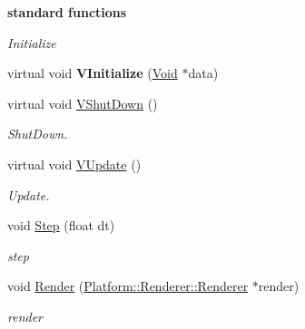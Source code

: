 \begin{Indent}{\bf standard functions}\par
{\em \label{_amgrp57f1c50bd31a278c7d9f58b3e669c84c}
 Initialize }\begin{DoxyCompactItemize}
\item 
\hypertarget{classContent_1_1CO__SC__AD__Scene_af5c7b40892d2fbdadddead7c5d79ab86}{
virtual void {\bfseries VInitialize} (\hyperlink{structVoid}{Void} $\ast$data)}
\label{classContent_1_1CO__SC__AD__Scene_af5c7b40892d2fbdadddead7c5d79ab86}

\item 
\hypertarget{classContent_1_1CO__SC__AD__Scene_a0c19bd4da2e1e19bec6e485b46fd89e2}{
virtual void \hyperlink{classContent_1_1CO__SC__AD__Scene_a0c19bd4da2e1e19bec6e485b46fd89e2}{VShutDown} ()}
\label{classContent_1_1CO__SC__AD__Scene_a0c19bd4da2e1e19bec6e485b46fd89e2}

\begin{DoxyCompactList}\small\item\em ShutDown. \item\end{DoxyCompactList}\item 
\hypertarget{classContent_1_1CO__SC__AD__Scene_a9dab2f703aefcb5eee0aed675c35ba80}{
virtual void \hyperlink{classContent_1_1CO__SC__AD__Scene_a9dab2f703aefcb5eee0aed675c35ba80}{VUpdate} ()}
\label{classContent_1_1CO__SC__AD__Scene_a9dab2f703aefcb5eee0aed675c35ba80}

\begin{DoxyCompactList}\small\item\em Update. \item\end{DoxyCompactList}\item 
\hypertarget{classContent_1_1CO__SC__AD__Scene_a936f561be7ea6142ecb7bed0774beba7}{
void \hyperlink{classContent_1_1CO__SC__AD__Scene_a936f561be7ea6142ecb7bed0774beba7}{Step} (float dt)}
\label{classContent_1_1CO__SC__AD__Scene_a936f561be7ea6142ecb7bed0774beba7}

\begin{DoxyCompactList}\small\item\em step \item\end{DoxyCompactList}\item 
\hypertarget{classContent_1_1CO__SC__AD__Scene_a4378daa9508e277071c1c3ec9ef480d7}{
void \hyperlink{classContent_1_1CO__SC__AD__Scene_a4378daa9508e277071c1c3ec9ef480d7}{Render} (\hyperlink{classPlatform_1_1Renderer_1_1Renderer}{Platform::Renderer::Renderer} $\ast$render)}
\label{classContent_1_1CO__SC__AD__Scene_a4378daa9508e277071c1c3ec9ef480d7}

\begin{DoxyCompactList}\small\item\em render \item\end{DoxyCompactList}\end{DoxyCompactItemize}
\end{Indent}
